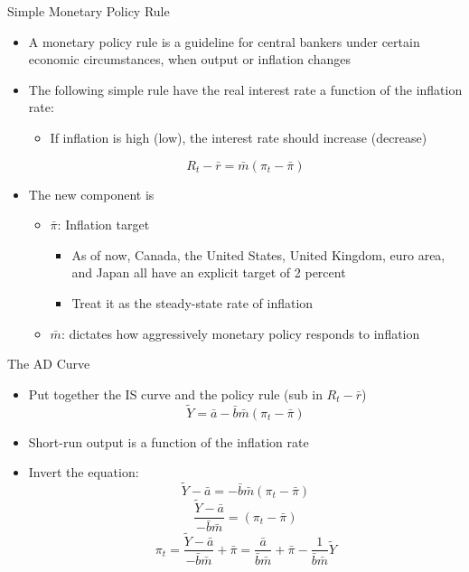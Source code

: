 \documentclass[aspectratio=1610]{beamer}
\begin{document}
\begin{frame}[wide]{Simple Monetary Policy Rule}
	\begin{itemize}
		\item A monetary policy rule is a guideline for central bankers under certain economic circumstances, when output or inflation changes
		\vspace{2mm}
		\item The following simple rule have the real interest rate a function of the inflation rate:
		\vspace{2mm}
		\begin{itemize}
			\item If inflation is high (low), the interest rate should increase (decrease)
		\end{itemize}
		\vspace{2mm}
		\[R_t - \bar{r} = \bar{m} \left(\pi_t - \bar{\pi}\right)\]
		\item The new component is 
		\vspace{2mm}
		\begin{itemize}
			\item $\bar{\pi}$: Inflation target
			\vspace{2mm}
			\begin{itemize}
				\item As of now, Canada, the United States, United Kingdom, euro area, and Japan all have an explicit target of 2 percent
				\item Treat it as the steady-state rate of inflation 
			\end{itemize}
			\vspace{2mm}
			\item $\bar{m}$: dictates how aggressively monetary policy responds to inflation
		\end{itemize}
	\end{itemize}
\end{frame}

\begin{frame}[wide]{The AD Curve}
	\begin{itemize}
		\item Put together the IS curve and the policy rule (sub in $R_t - \bar{r}$)
		\[\tilde{Y} = \bar{a} - \bar{b} \bar{m} \left(\pi_t - \bar{\pi}\right)\]
		\vspace{2mm}
		\item Short-run output is a function of the inflation rate
		\vspace{2mm}
		\item Invert the equation:
		\[\tilde{Y} - \bar{a} = -\bar{b}\bar{m} \left(\pi_t - \bar{\pi}\right)\]
		\[\frac{\tilde{Y} - \bar{a}}{-\bar{b}\bar{m}} =  \left(\pi_t - \bar{\pi}\right)\]
		\[\pi_t  = \frac{\tilde{Y} - \bar{a}}{-\bar{b}\bar{m}} + \bar{\pi} = \frac{ \bar{a}}{\bar{b}\bar{m}}+ \bar{\pi} - \frac{1}{\bar{b}\bar{m}} \tilde{Y}\]
	\end{itemize}
\end{frame}
\end{document}
